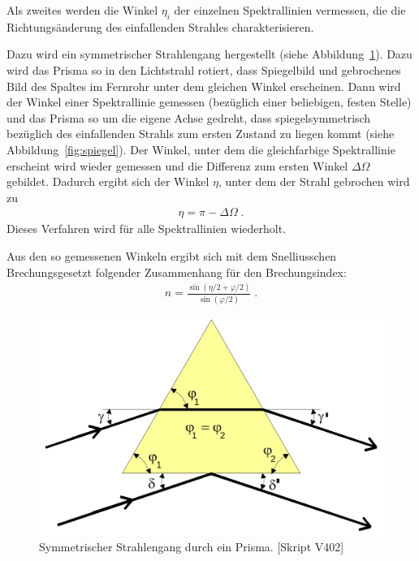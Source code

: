 \par
Als zweites werden die Winkel $\eta_i$ der einzelnen Spektrallinien vermessen, die die Richtungsänderung des einfallenden Strahles charakterisieren.

Dazu wird ein symmetrischer Strahlengang hergestellt (siehe Abbildung~\ref{fig:sympris}). Dazu wird das Prisma so in den Lichtstrahl rotiert, dass Spiegelbild und gebrochenes Bild des Spaltes im Fernrohr unter dem gleichen Winkel erscheinen. Dann wird der Winkel einer Spektrallinie gemessen (bezüglich einer beliebigen, festen Stelle) und das Prisma so um die eigene Achse gedreht, dass spiegelsymmetrisch bezüglich des einfallenden Strahls zum ersten Zustand zu liegen kommt (siehe Abbildung~\ref{fig:spiegel}). Der Winkel, unter dem die gleichfarbige Spektrallinie erscheint wird wieder gemessen und die Differenz zum ersten Winkel $\Delta\Omega$ gebildet. Dadurch ergibt sich der Winkel $\eta$, unter dem der Strahl gebrochen wird zu
\begin{align}\label{equ:eta_}
	\eta = \pi - \Delta\Omega \;.
\end{align}
Dieses Verfahren wird für alle Spektrallinien wiederholt.

Aus den so gemessenen Winkeln ergibt sich mit dem Snelliusschen Brechungsgesetzt folgender Zusammenhang für den Brechungsindex:
\begin{align}\label{equ:brech}
	n = \frac{\sin(\eta/2+\varphi/2)}{\sin(\varphi/2)} \;.
\end{align}

\begin{figure}
  \centering
  \includegraphics[width=0.4\textheight]{../figures/sym.png}
  \caption{Symmetrischer Strahlengang durch ein Prisma. [Skript V402]}
\label{fig:sympris}
\end{figure}

